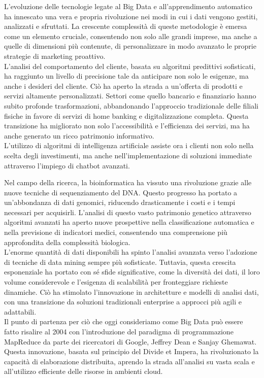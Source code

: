 L'evoluzione delle tecnologie legate al Big Data e all'apprendimento automatico ha innescato una vera e propria rivoluzione nei modi in cui i dati vengono gestiti, analizzati e sfruttati. 
La crescente complessità di queste metodologie è emersa come un elemento cruciale, consentendo non solo alle grandi imprese, ma anche a quelle di dimensioni più contenute, di personalizzare in modo avanzato le proprie strategie di marketing proattivo. \\
L'analisi del comportamento del cliente, basata su algoritmi predittivi sofisticati, ha raggiunto un livello di precisione tale da anticipare non solo le esigenze, ma anche i desideri del cliente.
Ciò ha aperto la strada a un'offerta di prodotti e servizi altamente personalizzati. 
Settori come quello bancario e finanziario hanno subito profonde trasformazioni, abbandonando l'approccio tradizionale delle filiali fisiche in favore di servizi di home banking e digitalizzazione completa.
Questa transizione ha migliorato non solo l'accessibilità e l'efficienza dei servizi, ma ha anche generato un ricco patrimonio informativo. \\
L'utilizzo di algoritmi di intelligenza artificiale assiste ora i clienti non solo nella scelta degli investimenti, ma anche nell'implementazione di soluzioni immediate attraverso l'impiego di chatbot avanzati.

Nel campo della ricerca, la bioinformatica ha vissuto una rivoluzione grazie alle nuove tecniche di sequenziamento del DNA. 
Questo progresso ha portato a un'abbondanza di dati genomici, riducendo drasticamente i costi e i tempi necessari per acquisirli. 
L'analisi di questo vasto patrimonio genetico attraverso algoritmi avanzati ha aperto nuove prospettive nella classificazione automatica e nella previsione di indicatori medici, consentendo una comprensione più approfondita della complessità biologica. \\
L'enorme quantità di dati disponibili ha spinto l'analisi avanzata verso l'adozione di tecniche di data mining sempre più sofisticate.
Tuttavia, questa crescita esponenziale ha portato con sé sfide significative, come la diversità dei dati, il loro volume considerevole e l'esigenza di scalabilità per fronteggiare richieste dinamiche. 
Ciò ha stimolato l'innovazione in architetture e modelli di analisi dati, con una transizione da soluzioni tradizionali enterprise a approcci più agili e adattabili. \\
Il punto di partenza per ciò che oggi consideriamo come Big Data può essere fatto risalire al 2004 con l'introduzione del paradigma di programmazione MapReduce da parte dei ricercatori di Google, Jeffrey Dean e Sanjay Ghemawat. 
Questa innovazione, basata sul principio del Divide et Impera, ha rivoluzionato la capacità di elaborazione distribuita, aprendo la strada all'analisi su vasta scala e all'utilizzo efficiente delle risorse in ambienti cloud.

